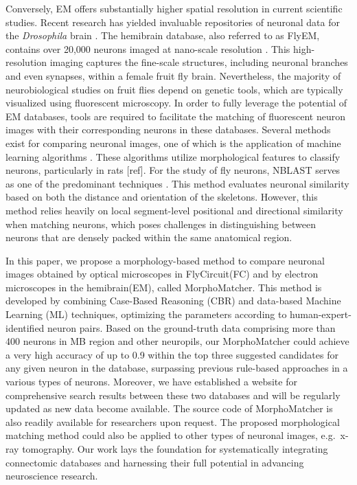 \documentclass[10pt,a4paper]{article}
\begin{document}
Conversely, EM offers substantially higher spatial resolution in current
scientific studies. Recent research has yielded invaluable repositories of
neuronal data for the \textit{Drosophila} brain
\citep{Hulse2021,Dorkenwald2022,Dorkenwald2024}. The hemibrain database, also
referred to as FlyEM, contains over 20{,}000 neurons imaged at nano-scale
resolution \citep{Hulse2021}. This high-resolution imaging captures the
fine-scale structures, including neuronal branches and even synapses, within a
female fruit fly brain. Nevertheless, the majority of neurobiological studies on
fruit flies depend on genetic tools, which are typically visualized using
fluorescent microscopy. In order to fully leverage the potential of EM
databases, tools are required to facilitate the matching of fluorescent neuron
images with their corresponding neurons in these databases.
Several methods exist for comparing neuronal images, one of which is the
application of machine learning algorithms \citep{Scorcioni2008,Armananzas2015}. These algorithms utilize morphological features
to classify neurons, particularly in rats [ref].%
For the study of fly neurons,
NBLAST serves as one of the predominant techniques \citep{Costa2016}. This method
evaluates neuronal similarity based on both the distance and orientation of the
skeletons. However, this method relies heavily on local segment-level positional
and directional similarity when matching neurons, which poses challenges in
distinguishing between neurons that are densely packed within the same
anatomical region.

In this paper, we propose a morphology-based method to compare neuronal images
obtained by optical microscopes in FlyCircuit(FC) and by electron microscopes in the
hemibrain(EM), called MorphoMatcher. This method is developed by combining
Case-Based Reasoning (CBR) and data-based Machine Learning (ML) techniques,
optimizing the parameters according to human-expert-identified neuron pairs.
Based on the ground-truth data comprising more than 400 neurons in MB region and
other neuropils, our MorphoMatcher could achieve a very high accuracy of up to
0.9 within the top three suggested candidates for any given neuron in the
database, surpassing previous rule-based approaches in a various types of
neurons. Moreover, we have established a website for comprehensive search results
between these two databases and will be regularly updated as new data become
available. The source code of MorphoMatcher is also readily available for
researchers upon request. The proposed morphological matching method could also
be applied to other types of neuronal images, e.g.\ x-ray tomography. Our work
lays the foundation for systematically integrating connectomic databases and
harnessing their full potential in advancing neuroscience research.
\end{document}
